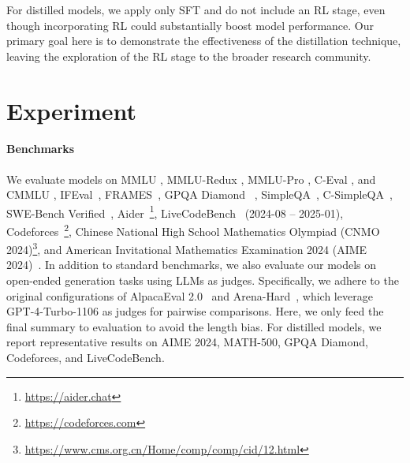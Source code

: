 \documentclass[11pt, a4paper, logo, copyright, nonumbering]{deepseek}
\begin{document}
{For distilled models, we apply only SFT and do not include an RL stage, even though incorporating RL could substantially boost model performance. Our primary goal here is to demonstrate the effectiveness of the distillation technique, leaving the exploration of the RL stage to the broader research community.

\section{Experiment}

\paragraph{Benchmarks} We evaluate models on MMLU \citep{mmlu}, MMLU-Redux \citep{mmlu_redux}, MMLU-Pro \citep{mmlu_pro}, C-Eval \citep{ceval}, and CMMLU \citep{cmmlu}, IFEval~\citep{IFeval}, FRAMES~\citep{frames}, GPQA Diamond ~\citep{gpqa}, SimpleQA~\citep{simpleqa}, C-SimpleQA~\citep{csimpleqa}, SWE-Bench Verified~\citep{swe_verified}, Aider~\footnote{\url{https://aider.chat}}, LiveCodeBench~\citep{livecodebench} (2024-08 -- 2025-01), Codeforces~\footnote{\url{https://codeforces.com}}, Chinese National High School Mathematics Olympiad (CNMO 2024)\footnote{\url{https://www.cms.org.cn/Home/comp/comp/cid/12.html}}, and American Invitational Mathematics Examination 2024 (AIME 2024)~\citep{AIME2024}. 
In addition to standard benchmarks, we also evaluate our models on open-ended generation tasks using LLMs as judges. 
Specifically, we adhere to the original configurations of AlpacaEval 2.0~\citep{alpaca2.0} and Arena-Hard~\citep{li2024crowdsourced}, which leverage GPT-4-Turbo-1106 as judges for pairwise comparisons. Here, we only feed the final summary to evaluation to avoid the length bias. 
For distilled models, we report representative results on AIME 2024, MATH-500, GPQA Diamond, Codeforces, and LiveCodeBench.


}
\end{document}
